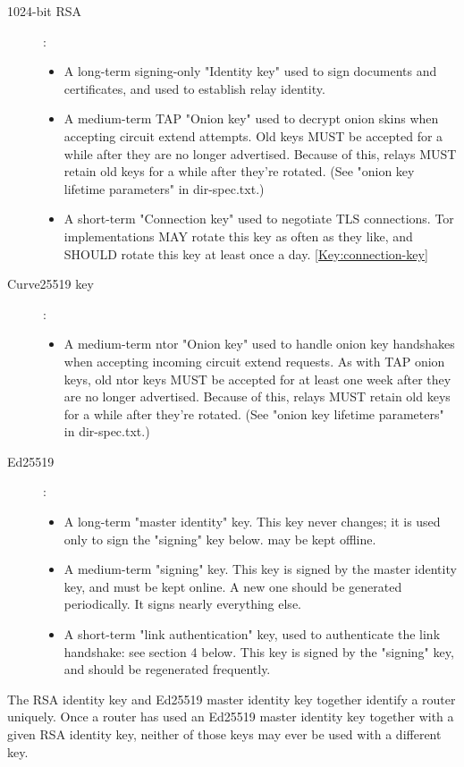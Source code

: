 \begin{description}
	\item [1024-bit RSA] :
	\begin{itemize}
		\item A long-term signing-only "Identity key" used to sign documents and certificates, and used to establish relay identity.
		\item A medium-term TAP "Onion key" used to decrypt onion skins when accepting circuit extend attempts.%
		Old keys MUST be accepted for a while after they are no longer advertised.  Because of this, relays MUST retain old keys for a while after they're rotated. (See "onion key lifetime parameters" in dir-spec.txt.) %
		\item A short-term "Connection key" used to negotiate TLS connections. Tor implementations MAY rotate this key as often as they like, and SHOULD rotate this key at least once a day.\label{key:link_auth_rsa} \ref{Key:connection-key}
	\end{itemize}
	\item [Curve25519 key] :
	\begin{itemize}
		\item A medium-term ntor "Onion key" used to handle onion key handshakes when accepting incoming circuit extend requests.  As with TAP onion keys, old ntor keys MUST be accepted for at least one week after they are no longer advertised.  Because of this, relays MUST retain old keys for a while after they're rotated. (See "onion key lifetime parameters" in dir-spec.txt.) %
	\end{itemize}
	\item [Ed25519] :
	\begin{itemize}
		\item A long-term "master identity" key.  This key never changes; it is used only to sign the "signing" key below. may be kept offline.
		\item A medium-term "signing" key.  This key is signed by the master identity key, and must be kept online.  A new one should be generated periodically.  It signs nearly everything else.
		\item A short-term "link authentication" key, used to authenticate the link handshake: see section 4 below.  This key is signed by the "signing" key, and should be regenerated frequently. \label{key:link_auth_ed25519}
	\end{itemize}
\end{description}

The RSA identity key and Ed25519 master identity key together identify a router uniquely.  Once a router has used an Ed25519 master identity key together with a given RSA identity key, neither of those keys may ever be used with a different key.

